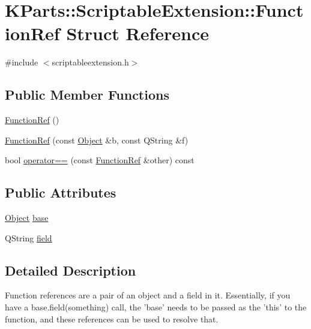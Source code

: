 \hypertarget{structKParts_1_1ScriptableExtension_1_1FunctionRef}{\section{\-K\-Parts\-:\-:\-Scriptable\-Extension\-:\-:\-Function\-Ref \-Struct \-Reference}
\label{structKParts_1_1ScriptableExtension_1_1FunctionRef}
}


{\ttfamily \#include $<$scriptableextension.\-h$>$}

\subsection*{\-Public \-Member \-Functions}
\begin{DoxyCompactItemize}
\item 
\hyperlink{structKParts_1_1ScriptableExtension_1_1FunctionRef_a86b2595b7fdf73a3bc128b295792f3da}{\-Function\-Ref} ()
\item 
\hyperlink{structKParts_1_1ScriptableExtension_1_1FunctionRef_a0349d019315c9ec43aa75c91c184b500}{\-Function\-Ref} (const \hyperlink{structKParts_1_1ScriptableExtension_1_1Object}{\-Object} \&b, const \-Q\-String \&f)
\item 
bool \hyperlink{structKParts_1_1ScriptableExtension_1_1FunctionRef_a97f50a9c52fb32ae83cfc07768866c9d}{operator==} (const \hyperlink{structKParts_1_1ScriptableExtension_1_1FunctionRef}{\-Function\-Ref} \&other) const 
\end{DoxyCompactItemize}
\subsection*{\-Public \-Attributes}
\begin{DoxyCompactItemize}
\item 
\hyperlink{structKParts_1_1ScriptableExtension_1_1Object}{\-Object} \hyperlink{structKParts_1_1ScriptableExtension_1_1FunctionRef_aefa54e151818239bce80641973c79e18}{base}
\item 
\-Q\-String \hyperlink{structKParts_1_1ScriptableExtension_1_1FunctionRef_a1e3cffbdcfde393b9ff6243080edbbd4}{field}
\end{DoxyCompactItemize}


\subsection{\-Detailed \-Description}
\-Function references are a pair of an object and a field in it. \-Essentially, if you have a base.\-field(something) call, the 'base' needs to be passed as the 'this' to the function, and these references can be used to resolve that. 

